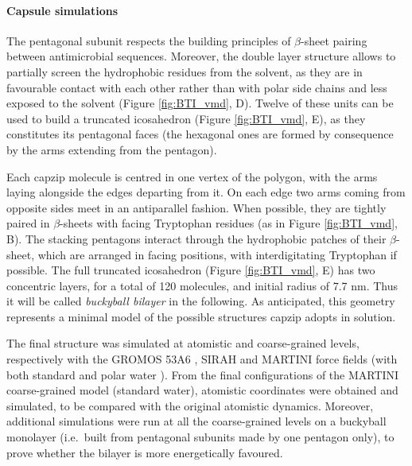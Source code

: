 \paragraph{Capsule simulations} The pentagonal subunit respects the building principles of $\beta$-sheet pairing between antimicrobial sequences. Moreover, the double layer structure allows to partially screen the hydrophobic residues from the solvent, as they are in favourable contact with each other rather than with polar side chains and less exposed to the solvent (Figure \ref{fig:BTI_vmd}, D).
%
Twelve of these units can be used to build a truncated icosahedron (Figure \ref{fig:BTI_vmd}, E), as they constitutes its pentagonal faces (the hexagonal ones are formed by consequence by the arms extending from the pentagon).

Each capzip molecule is centred in one vertex of the polygon, with the arms laying alongside the edges departing from it. On each edge two arms coming from opposite sides meet in an antiparallel fashion. When possible, they are tightly paired in $\beta$-sheets with facing Tryptophan residues (as in Figure \ref{fig:BTI_vmd}, B). The stacking pentagons interact through the hydrophobic patches of their $\beta$-sheet, which are arranged in facing positions, with interdigitating Tryptophan if possible.
%
The full truncated icosahedron (Figure \ref{fig:BTI_vmd}, E) has two concentric layers, for a total of 120 molecules, and initial radius of 7.7 nm. Thus it will be called \emph{buckyball bilayer} in the following.
%
As anticipated, this geometry represents a minimal model of the possible structures capzip adopts in solution.

The final structure was simulated at atomistic and coarse-grained levels, respectively with the GROMOS 53A6 \citep{Oostenbrink2004}, SIRAH \citep{Machado2018} and MARTINI \citep{Marrink2007, Monticelli2008} force fields (with both standard and polar water \citep{Yesylevskyy2010}).
From the final configurations of the MARTINI coarse-grained model (standard water), atomistic coordinates were obtained and simulated, to be compared with the original atomistic dynamics.
%
Moreover, additional simulations were run at all the coarse-grained levels on a buckyball monolayer (i.e.\ built from pentagonal subunits made by one pentagon only), to prove whether the bilayer is more energetically favoured.

